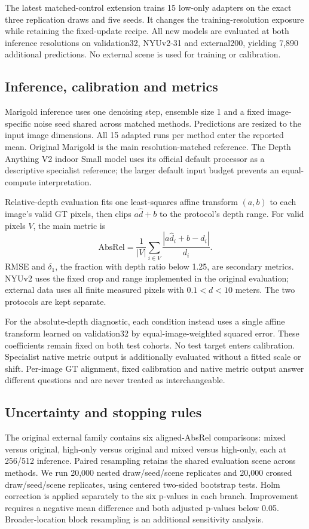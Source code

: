 The latest matched-control extension trains 15 low-only adapters on the exact three replication draws and five seeds. It changes the training-resolution exposure while retaining the fixed-update recipe. All new models are evaluated at both inference resolutions on validation32, NYUv2-31 and external200, yielding 7,890 additional predictions. No external scene is used for training or calibration.

\subsection{Inference, calibration and metrics}
Marigold inference uses one denoising step, ensemble size 1 and a fixed image-specific noise seed shared across matched methods. Predictions are resized to the input image dimensions. All 15 adapted runs per method enter the reported mean. Original Marigold is the main resolution-matched reference. The Depth Anything V2 indoor Small model uses its official default processor as a descriptive specialist reference; the larger default input budget prevents an equal-compute interpretation.

Relative-depth evaluation fits one least-squares affine transform $(a,b)$ to each image's valid GT pixels, then clips $a\hat d+b$ to the protocol's depth range. For valid pixels $V$, the main metric is
\begin{equation}
\mathrm{AbsRel}=\frac{1}{|V|}\sum_{i\in V}\frac{|a\hat d_i+b-d_i|}{d_i}.
\end{equation}
RMSE and $\delta_1$, the fraction with depth ratio below 1.25, are secondary metrics. NYUv2 uses the fixed crop and range implemented in the original evaluation; external data uses all finite measured pixels with $0.1<d<10$ meters. The two protocols are kept separate.

For the absolute-depth diagnostic, each condition instead uses a single affine transform learned on validation32 by equal-image-weighted squared error. These coefficients remain fixed on both test cohorts. No test target enters calibration. Specialist native metric output is additionally evaluated without a fitted scale or shift. Per-image GT alignment, fixed calibration and native metric output answer different questions and are never treated as interchangeable.

\subsection{Uncertainty and stopping rules}
The original external family contains six aligned-AbsRel comparisons: mixed versus original, high-only versus original and mixed versus high-only, each at 256/512 inference. Paired resampling retains the shared evaluation scene across methods. We run 20,000 nested draw/seed/scene replicates and 20,000 crossed draw/seed/scene replicates, using centered two-sided bootstrap tests. Holm correction is applied separately to the six p-values in each branch. Improvement requires a negative mean difference and both adjusted p-values below 0.05. Broader-location block resampling is an additional sensitivity analysis.

